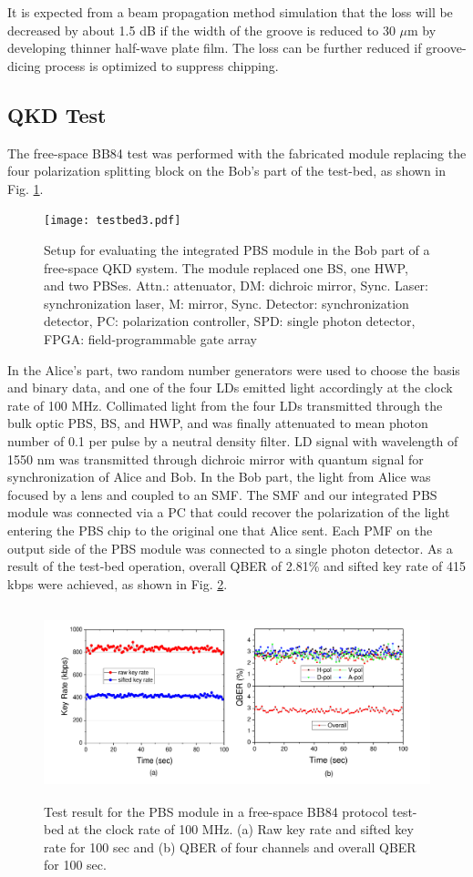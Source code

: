 \documentclass[letterpaper, 10pt]{article}
\begin{document}
It is expected from a beam propagation method simulation that the loss will be decreased by about 1.5 dB if the width of the groove is reduced to 30 $\mu$m by developing thinner half-wave plate film.
The loss can be further reduced if groove-dicing process is optimized to suppress chipping.

\subsection{QKD Test}

The free-space BB84 test was performed with the fabricated module replacing the four polarization splitting block on the Bob's part of the test-bed, as shown in Fig. \ref{fig:testbed}.
\begin{figure}
  \centering
  \texttt{[image: testbed3.pdf]}
  \caption{Setup for evaluating the integrated PBS module in the Bob part of a free-space QKD system. The module replaced one BS, one HWP, and two PBSes. Attn.: attenuator, DM: dichroic mirror, Sync. Laser: synchronization laser, M: mirror, Sync. Detector: synchronization detector, PC: polarization controller, SPD: single photon detector, FPGA: field-programmable gate array}
  \label{fig:testbed}
\end{figure}
In the Alice's part, two random number generators were used to choose the basis and binary data, and one of the four LDs emitted light accordingly at the clock rate of 100 MHz.
Collimated light from the four LDs transmitted  through the bulk optic PBS, BS, and HWP, and was finally attenuated to mean photon number of 0.1 per pulse by a neutral density filter.
LD signal with wavelength of 1550 nm was transmitted through dichroic mirror with quantum signal for synchronization of Alice and Bob.
In the Bob part, the light from Alice was  focused by a lens and coupled to an SMF.
The SMF and our integrated PBS module was connected via a PC that could recover the polarization of the light entering the PBS chip to the original one that Alice sent.
Each PMF on the output side of the PBS module was connected to a single photon detector.
As a result of the test-bed operation, overall QBER of 2.81\% and sifted key rate of 415 kbps were achieved, as shown in Fig. \ref{fig:QKD_result}.
\begin{figure}[ht]
  \centering
  \includegraphics[height=5.6cm]{QKD_result}
  \caption{Test result for the PBS module in a free-space BB84 protocol test-bed at the clock rate of 100 MHz. (a) Raw key rate and sifted key rate for 100 sec and (b) QBER of four channels and overall QBER for 100 sec.}
  \label{fig:QKD_result}
\end{figure}
\end{document}
